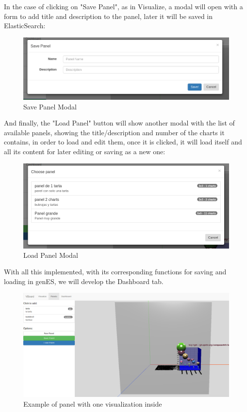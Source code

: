 \documentclass[a4paper, 12pt]{book}
\begin{document}
In the case of clicking on "Save Panel", as in Visualize, a modal will open with a form to add title and description to the panel, later it will be saved in ElasticSearch:

\begin{figure}[H]
  \centering
  \includegraphics[width=16cm, keepaspectratio]{img/development/savepanelmodal}
  \caption{Save Panel Modal}
  \label{fig:savepanelmodal}
\end{figure}

And finally, the "Load Panel" button will show another modal with the list of available panels, showing the title/description and number of the charts it contains, in order to load and edit them, once it is clicked, it will load itself and all its content for later editing or saving as a new one:

\begin{figure}[H]
  \centering
  \includegraphics[width=16cm, keepaspectratio]{img/development/loadpanelmodal}
  \caption{Load Panel Modal}
  \label{fig:loadpanelmodal}
\end{figure}

With all this implemented, with its corresponding functions for saving and loading in genES, we will develop the Dashboard tab.

\begin{figure}[H]
  \centering
  \includegraphics[width=16cm, keepaspectratio]{img/development/examplepanelbubbles}
  \caption{Example of panel with one visualization inside}
  \label{fig:examplepanelbubbles}
\end{figure}
\end{document}
